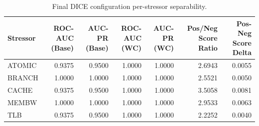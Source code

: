 \begin{table}[t]
\centering
\caption{Final DICE configuration per-stressor separability.}
\label{tab:dice_full_stressor}
\footnotesize
\begin{tabular}{lrrrrrr}
\toprule
Stressor & ROC-AUC (Base) & AUC-PR (Base) & ROC-AUC (WC) & AUC-PR (WC) & Pos/Neg Score Ratio & Pos-Neg Score Delta \\
\midrule
ATOMIC & 0.9375 & 0.9500 & 1.0000 & 1.0000 & 2.6943 & 0.0055 \\
BRANCH & 1.0000 & 1.0000 & 1.0000 & 1.0000 & 2.5521 & 0.0050 \\
CACHE & 0.9375 & 0.9500 & 1.0000 & 1.0000 & 3.5058 & 0.0081 \\
MEMBW & 1.0000 & 1.0000 & 1.0000 & 1.0000 & 2.9533 & 0.0063 \\
TLB & 0.9375 & 0.9500 & 1.0000 & 1.0000 & 2.2252 & 0.0040 \\
\bottomrule
\end{tabular}

\end{table}
